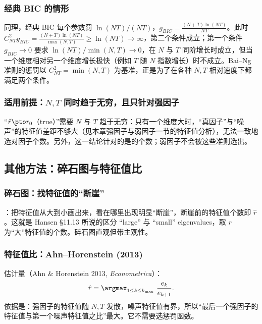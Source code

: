 \subsubsection{经典 BIC 的情形}

同理，经典 BIC 每个参数罚 $\ln(NT)/(NT)$，$g_{BIC}=\frac{(N+T)\ln(NT)}{NT}$。此时 $C_{NT}^2g_{BIC}=\frac{(N+T)\ln(NT)}{\max(N,T)}\ge\ln(NT)\to\infty$，第二个条件成立；第一个条件 $g_{BIC}\to0$ 要求 $\ln(NT)/\min(N,T)\to0$，在 $N$ 与 $T$ 同阶增长时成立，但当一个维度相对另一个维度增长极快（例如 $T$ 随 $N$ 指数增长）时不成立。Bai--Ng 准则的惩罚以 $C_{NT}^2=\min(N,T)$ 为基准，正是为了在各种 $N,T$ 相对速度下都满足两个条件。

\subsubsection{适用前提：\texorpdfstring{$N,T$}{N,T} 同时趋于无穷，且只针对强因子}

“$\hat r\pto r_0$（true）”需要 $N$ 与 $T$ 趋于无穷：只有一个维度大时，“真因子”与“噪声”的特征值差距不够大（见本章强因子与弱因子一节的特征值分析），无法一致地选对因子个数。另外，这一结论针对的是的个数；弱因子不会被这些准则选出。

\subsection{其他方法：碎石图与特征值比 \tagext}

\subsubsection{碎石图：找特征值的“断崖”}

：把特征值从大到小画出来，看在哪里出现明显“断崖”，断崖前的特征值个数即 $\hat r$。这就是 Hansen §11.13 所说的区分 “large” 与 “small” eigenvalues，取 $r$ 为“大”特征值的个数。碎石图直观但带主观性。

\subsubsection{特征值比：Ahn--Horenstein (2013)}

估计量（Ahn \& Horenstein 2013, \emph{Econometrica}）：
\[
\hat r=\argmax_{1\le k\le k_{\max}}\ \frac{e_k}{e_{k+1}} .
\]
依据是：强因子的特征值随 $N,T$ 发散，噪声特征值有界，所以“最后一个强因子的特征值与第一个噪声特征值之比”最大。它不需要选惩罚函数。

